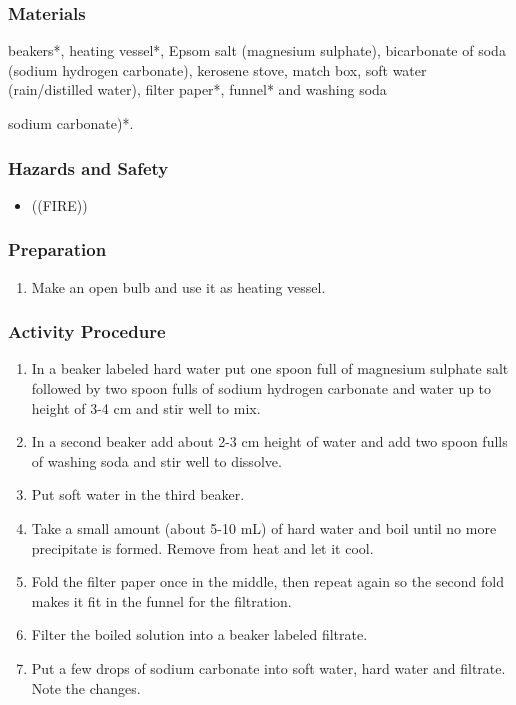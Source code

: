 \subsubsection*{Materials}
beakers*, heating vessel*, Epsom salt (magnesium sulphate), bicarbonate of soda (sodium hydrogen carbonate), kerosene stove, match box, soft water (rain/distilled water), filter paper*, funnel* and washing soda {sodium carbonate)*.

\subsubsection*{Hazards and Safety}
\begin{itemize}
\item{((FIRE))}
\end{itemize}

\subsubsection*{Preparation}
\begin{enumerate}
\item{Make an open bulb and use it as heating vessel.}
\end{enumerate}

\subsubsection*{Activity Procedure}
\begin{enumerate}
\item{In a beaker labeled hard water put one spoon full of magnesium sulphate salt followed by two spoon fulls of sodium hydrogen carbonate and water up to height of 3-4 cm and stir well to mix.}
\item{In a second beaker add about 2-3 cm height of water and add two spoon fulls of washing soda and stir well to dissolve.}
\item{Put soft water in the third beaker.}
\item{Take a small amount (about 5-10 mL) of hard water and boil until no more precipitate is formed. Remove from heat and let it cool.}
\item{Fold the filter paper once in the middle, then repeat again so the second fold makes it fit in the funnel for the filtration.}
\item{Filter the boiled solution into a beaker labeled filtrate.}
\item{Put a few drops of sodium carbonate into soft water, hard water and filtrate. Note the changes.}
\end{enumerate}

}
